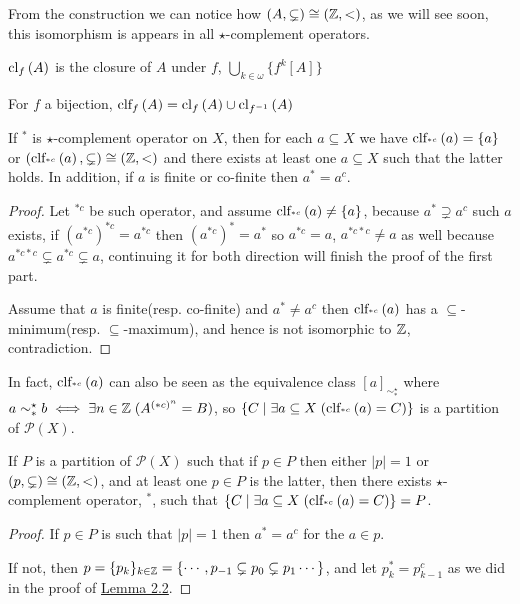 	
	From the construction we can notice how $(A,\subsetneq)\cong(\Bbb{Z},<)$, as we will see soon, this isomorphism is appears in all $\star$-complement operators.
	
	\begin{definition}
		$\cl{A}{f}$ is the closure of $A$ under $f$, $\bigcup_{k\in\omega}\{f^k[A]\}$
	\end{definition}

	\begin{definition}
		For $f$ a bijection, $\clf{A}{f}=\cl{A}{f}\cup \cl{A}{f^{-1}}$
	\end{definition}
	\begin{theorem}\label{thm:2.5}
		If $^{*}$ is $\star$-complement operator on $X$, then for each $a\subseteq X$ we have $\clf{a}{^{*c}}=\{a\}$ or $(\clf{a}{^{*c}},\subsetneq)\cong(\Bbb{Z}, <)$ and there exists at least one $a\subseteq X$ such that the latter holds. In addition, if $a$ is finite or co-finite then $a^*=a^c$.
	\end{theorem}
	\begin{proof}
		Let $^{*c}$ be such operator, and assume $\clf{a}{^{*c}}\ne\{a\}$, because $a^{*}\supsetneq a^c$ such $a$ exists, if $(a^{*c})^{*c}=a^{*c}$ then $(a^{*c})^{*}=a^{*}$ so $a^{*c}=a$, $a^{*c*c}\ne a$ as well because $a^{*c*c}\subsetneq a^{*c}\subsetneq a$, continuing it for both direction will finish the proof of the first part.
		
		Assume that $a$ is finite(resp. co-finite) and $a^*\ne a^c$ then $\clf{a}{^{*c}}$ has a $\subseteq$-minimum(resp. $\subseteq$-maximum), and hence is not isomorphic to $\Bbb{Z}$, contradiction.
	\end{proof}
	In fact, $\clf{a}{^{*c}}$ can also be seen as the equivalence class $[a]_{\sim_*^\star}$ where $a\sim_*^\star b\iff \exists n\in\Bbb{Z}\;(A^{(*c)^n}=B)$, so $\{C\mid \exists a\subseteq X\;(\clf{a}{^{*c}}=C)\}$ is a partition of $\mathcal{P}(X)$.
	\begin{lemma}\label{lem:2.6}
		If $P$ is a partition of $\mathcal{P}(X)$ such that if $p\in P$ then either $|p|=1$ or $(p,\subsetneq)\cong(\Bbb{Z},<)$, and at least one $p \in P$ is the latter, then there exists $\star$-complement operator, $^*$, such that $\{C\mid \exists a\subseteq X\;(\clf{a}{^{*c}}=C)\}=P$.
	\end{lemma}
	\begin{proof}
		If $p\in P$ is such that $|p|=1$ then $a^*=a^c$ for the $a\in p$.
		
		If not, then $p=\{p_k\}_{k\in\Bbb{Z}}=\{\cdots, p_{-1}\subsetneq p_0\subsetneq p_1\cdots\}$, and let $p_k^*=p_{k-1}^c$ as we did in the proof of \hyperref[lem:2.2]{Lemma 2.2}.
	\end{proof}
	
